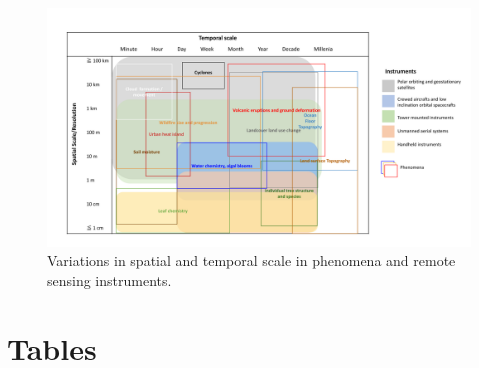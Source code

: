 \documentclass[
  12pt,
]{article}
\begin{document}
\begin{figure}
\centering
\includegraphics{scale_figure_tsr.png}
\caption{Variations in spatial and temporal scale in phenomena and
remote sensing instruments.}
\end{figure}

\hypertarget{tables}{%
\section{Tables}\label{tables}}
\end{document}
